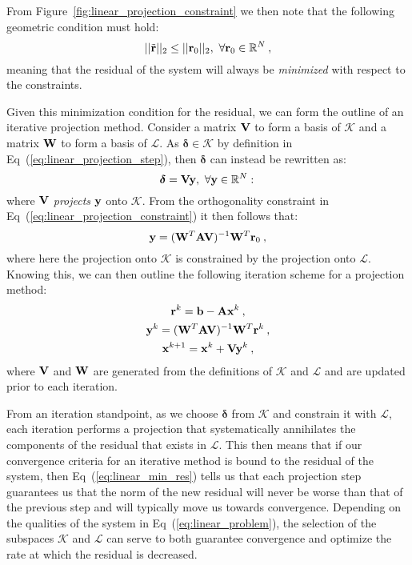 From Figure~\ref{fig:linear_projection_constraint} we then note that
the following geometric condition must hold:
\begin{equation}
  ||\tilde{\ve{r}}||_2 \leq ||\ve{r}_0||_2,\ \forall \ve{r}_0 \in
  \mathbb{R}^N\:,
  \label{eq:linear_min_res}
\end{equation}
meaning that the residual of the system will always be
\textit{minimized} with respect to the constraints.

Given this minimization condition for the residual, we can form the
outline of an iterative projection method. Consider a matrix $\mathbf{V}$
to form a basis of $\mathcal{K}$ and a matrix $\mathbf{W}$ to form a basis
of $\mathcal{L}$. As $\boldsymbol{\delta} \in \mathcal{K}$ by
definition in Eq~(\ref{eq:linear_projection_step}), then
$\boldsymbol{\delta}$ can instead be rewritten as:
\begin{equation}
  \boldsymbol{\delta} = \mathbf{V}\mathbf{y},\ \forall \mathbf{y} \in \mathbb{R}^N:\,
  \label{eq:linear_delta_projection}
\end{equation}
where $\mathbf{V}$ \textit{projects} $\mathbf{y}$ onto $\mathcal{K}$. From the
orthogonality constraint in Eq~(\ref{eq:linear_projection_constraint})
it then follows that:
\begin{equation}
  \mathbf{y} = (\mathbf{W}^T\mathbf{A}\mathbf{V})^{-1}\mathbf{W}^T\mathbf{r}_0\:,
  \label{eq:linear_constraint_projection}
\end{equation}
where here the projection onto $\mathcal{K}$ is constrained by the
projection onto $\mathcal{L}$. Knowing this, we can then outline the
following iteration scheme for a projection method:
\begin{subequations}
  \begin{gather}
    \mathbf{r}^k = \mathbf{b} - \mathbf{A}\mathbf{x}^k\:,\\  
    \mathbf{y}^k = (\mathbf{W}^T\mathbf{A}\mathbf{V})^{-1}\mathbf{W}^T\mathbf{r}^k\:,\\
    \mathbf{x}^{k+1} = \mathbf{x}^k + \mathbf{V}\mathbf{y}^k\:,
  \end{gather}
  \label{eq:linear_projection_iteration}
\end{subequations}
where $\mathbf{V}$ and $\mathbf{W}$ are generated from the definitions of
$\mathcal{K}$ and $\mathcal{L}$ and are updated prior to each
iteration.

From an iteration standpoint, as we choose $\boldsymbol{\delta}$ from
$\mathcal{K}$ and constrain it with $\mathcal{L}$, each iteration
performs a projection that systematically annihilates the components of
the residual that exists in $\mathcal{L}$. This then means that if our
convergence criteria for an iterative method is bound to the residual
of the system, then Eq~(\ref{eq:linear_min_res}) tells us that each
projection step guarantees us that the norm of the new residual will
never be worse than that of the previous step and will typically move
us towards convergence. Depending on the qualities of the system in
Eq~(\ref{eq:linear_problem}), the selection of the subspaces
$\mathcal{K}$ and $\mathcal{L}$ can serve to both guarantee
convergence and optimize the rate at which the residual is decreased.

